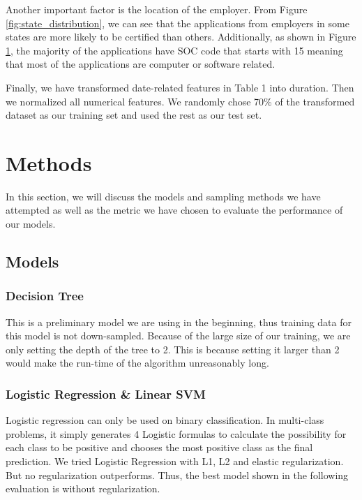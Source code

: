\documentclass{article}
\begin{document}
\begin{figure}[h]
\begin{minipage}{.31\textwidth}
        \label{fig:industry_distribution}
    \end{minipage}
\end{figure}

Another important  factor  is  the  location  of  the employer. From Figure \ref{fig:state_distribution}, we can see that the applications from employers in some states are more likely to be certified than others. Additionally, as shown in Figure \ref{fig:industry_distribution}, the majority of the applications have SOC code that starts with 15 meaning that most of the applications are computer or software related.

Finally, we have transformed date-related features in Table 1 into duration. Then we normalized all numerical features. We randomly chose 70\% of the transformed dataset as our training set and used the rest as our test set.

\section{Methods}
In this section, we will discuss the models and sampling methods we have attempted as well as the metric we have chosen to evaluate the performance of our models.
\subsection{Models}
\subsubsection{Decision Tree}


This is a preliminary model we are using in the beginning, thus training data for this model is not down-sampled. Because of the large size of our training, we are only setting the depth of the tree to 2. This is because setting it larger than 2 would make the run-time of the algorithm unreasonably long. 

\subsubsection{Logistic Regression \& Linear SVM}
Logistic regression can only be used on binary classification. In multi-class problems, it simply generates 4 Logistic formulas to calculate the possibility for each class to be positive and chooses the most positive class as the final prediction. We tried Logistic Regression with L1, L2 and elastic regularization. But no regularization outperforms. Thus, the best model shown in the following evaluation is without regularization. 
\end{document}
